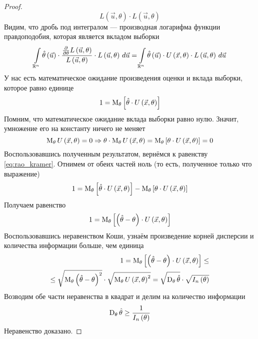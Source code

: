\begin{proof}
\begin{equation*}
{      {L\left( \vec{u},\theta \right)}
        \cdot L\left( \vec{u},\theta \right)}
  \end{equation*}
  Видим, что дробь под интегралом --- производная логарифма
  функции правдоподобия, которая является вкладом выборки
  \begin{equation*}
    \integral{\mathbb{R}^n}{}{\vec{u}}{\hat{\theta}\left( \vec{u} \right)
      \cdot \frac{
        \frac{\partial}{\partial \theta}L\left( \vec{u},\theta \right)}
        {L\left( \vec{u},\theta \right)}
          \cdot L\left( \vec{u},\theta \right)}
    = \integral{\mathbb{R}^n}{}{\vec{u}}{\hat{\theta}\left( \vec{u} \right)
      \cdot
        U\left( \vec{x},\theta \right)
          \cdot L\left( \vec{u},\theta \right)}
  \end{equation*}
  У нас есть математическое ожидание произведения оценки и вклада выборки,
  которое равно единице
  \begin{equation}\label{eq:rao_kramer}
    1 = \Meanof{\theta}{\hat{\theta}\cdot U\left( \vec{x},\theta \right)}
  \end{equation}
  Помним, что математическое ожидание вклада выборки равно нулю.
  Значит, умножение его на константу ничего не меняет
  \begin{equation*}
    \meanof{\theta}{U\left( \vec{x},\theta \right)}=0
    \Rightarrow 
    \theta \cdot \meanof{\theta}{U\left( \vec{x},\theta \right)}
    = \Meanof{\theta}{\theta \cdot U\left(\vec{x},\theta\right)}
    = 0
  \end{equation*}
  Воспользовавшись полученным результатом, вернёмся к равенству
  \eqref{eq:rao_kramer}.
  Отнимем от обеих частей ноль (то есть, полученное только что выражение)
  \begin{equation*}
    1 = \Meanof{\theta}{\hat{\theta}\cdot U\left( \vec{x},\theta \right)}
      - \Meanof{\theta}{\theta \cdot U\left(\vec{x},\theta\right)}
  \end{equation*}
  Получаем равенство
  \begin{equation*}
    1 = \Meanof{\theta}{\left(\hat{\theta}-\theta\right)
    \cdot U\left( \vec{x},\theta \right)}
  \end{equation*}
  Воспользовавшись неравенством Коши, узнаём
  произведение корней дисперсии и количества информации больше, чем единица
  \begin{equation}\label{eq:rao_kramer_koshi}
    \begin{split}
    1 = \meanof{\theta}{
      \left[\left(\hat{\theta}-\theta\right)
        \cdot U\left( \vec{x},\theta \right)\right]} \le \\
    \le \sqrt{\meanof{\theta}{
      \left(\hat{\theta}-\theta\right)^2}}
      \cdot \sqrt{\meanof{\theta}{U\left( \vec{x},\theta \right)^2}}
    = \sqrt{\dispersionof{\theta}{\hat{\theta}}}
      \cdot \sqrt{I_n\left(\theta\right)}
    \end{split}
  \end{equation}
  Возводим обе части неравенства в квадрат и делим на количество информации
  \begin{equation*}
    \dispersionof{\theta}{\hat{\theta}} \ge \frac{1}{I_n\left( \theta \right)}
  \end{equation*}
  Неравенство доказано.
\end{proof}
